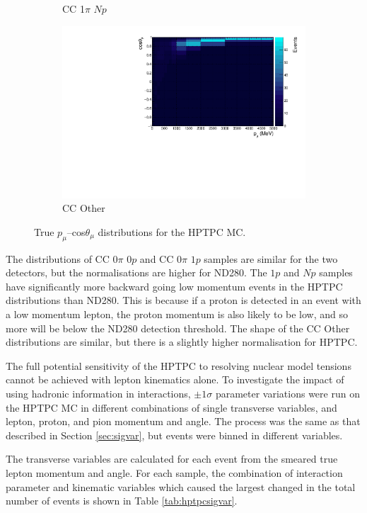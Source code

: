 \begin{figure}
\begin{subfigure}{.49\textwidth}
  \caption{CC 1$\pi$ $Np$}
\end{subfigure}
\begin{subfigure}{.49\textwidth}
  \centering
  \includegraphics[width=0.9\linewidth]{figs/hptpc_pmtmuu_ccOther.pdf}
  \caption{CC Other}
\end{subfigure}
\caption{True $p_{\mu}$--cos$\theta_{\mu}$ distributions for the HPTPC MC.}
\label{fig:hptpcPmuTmu}
\end{figure}

The distributions of CC 0$\pi$ $0p$ and CC 0$\pi$ $1p$ samples are similar for the two detectors, but the normalisations are higher for ND280. The $1p$ and $Np$ samples have significantly more backward going low momentum events in the HPTPC distributions than ND280. This is because if a proton is detected in an event with a low momentum lepton, the proton momentum is also likely to be low, and so more will be below the ND280 detection threshold. The shape of the CC Other distributions are similar, but there is a slightly higher normalisation for HPTPC.

The full potential sensitivity of the HPTPC to resolving nuclear model tensions cannot be achieved with lepton kinematics alone. To investigate the impact of using hadronic information in interactions, $\pm1\sigma$ parameter variations were run on the HPTPC MC in different combinations of single transverse variables, and lepton, proton, and pion momentum and angle. The process was the same as that described in Section \ref{sec:sigvar}, but events were binned in different variables.

The transverse variables are calculated for each event from the smeared true lepton momentum and angle. For each sample, the combination of interaction parameter and kinematic variables which caused the largest changed in the total number of events is shown in Table \ref{tab:hptpcsigvar}. 

